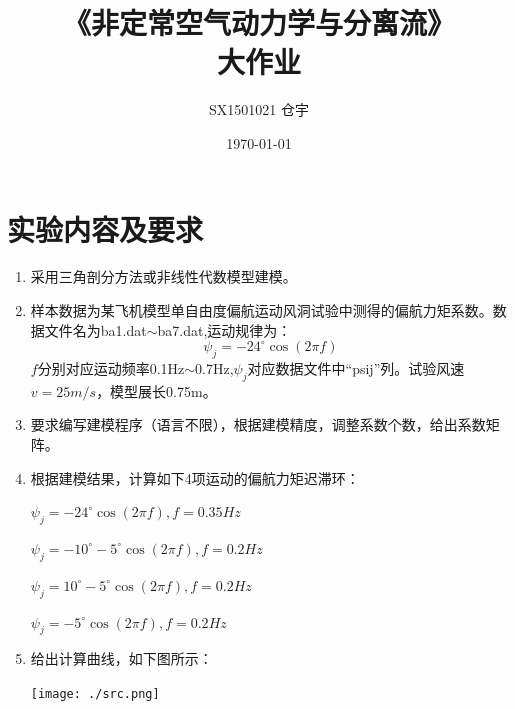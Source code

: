 \documentclass[UTF8]{ctexart}
\title{\heiti 《非定常空气动力学与分离流》 \\ 大作业}
\author{SX1501021 仓宇}
\date{\today}
\begin{document}
\maketitle
\setcounter{page}{0}
\thispagestyle{empty}

\clearpage

\tableofcontents

\clearpage

\section{实验内容及要求}
\begin{enumerate}[(1)]
\item 采用三角剖分方法或非线性代数模型建模。
\item 样本数据为某飞机模型单自由度偏航运动风洞试验中测得的偏航力矩系数。数据文件名为ba1.dat$\sim$ba7.dat,运动规律为：
\[\psi_j=-24^\circ \cos(2\pi f)\]
$f$分别对应运动频率0.1Hz$\sim$0.7Hz,$\psi_j$对应数据文件中“psij”列。试验风速$v=25m/s$，模型展长0.75m。
\item 要求编写建模程序（语言不限），根据建模精度，调整系数个数，给出系数矩阵。
\item 根据建模结果，计算如下4项运动的偏航力矩迟滞环：
\begin{center} $\psi_j=-24^\circ \cos(2\pi f), f=0.35Hz$\end{center}
\begin{center} $\psi_j=-10^\circ-5^\circ \cos(2\pi f), f=0.2Hz$ \end{center}
\begin{center} $\psi_j=10^\circ-5^\circ \cos(2\pi f),f=0.2Hz$ \end{center}
\begin{center} $\psi_j=-5^\circ \cos(2\pi f), f=0.2Hz$ \end{center}
\item 给出计算曲线，如下图所示：
\begin{center}
\texttt{[image: ./src.png]}
\end{center}
\end{enumerate}
\end{document}

